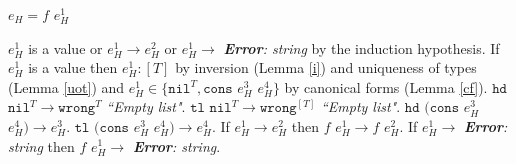 \begin{case}

$e_{H}=f$ $e_{H}^{1}$

$e_{H}^{1}$ is a value or $e_{H}^{1}\rightarrow e_{H}^{2}$ or $e_{H}^{1}\rightarrow$ \emph{\textbf{Error}: string} by the induction hypothesis.  If $e_{H}^{1}$ is a value then $e_{H}^{1}:[T]$ by inversion (Lemma \ref{i}) and uniqueness of types (Lemma \ref{uot}) and $e_{H}^{1}\in\lbrace\mathtt{nil}^{T},\mathtt{cons}$ $e_{H}^{3}$ $e_{H}^{4}\rbrace$ by canonical forms (Lemma \ref{cf}).  $\mathtt{hd}$ $\mathtt{nil}^{T}\rightarrow\mathtt{wrong}^{T}$ \emph{``Empty list"}.  $\mathtt{tl}$ $\mathtt{nil}^{T}\rightarrow\mathtt{wrong}^{[T]}$ \emph{``Empty list"}.  $\mathtt{hd}$ $(\mathtt{cons}$ $e_{H}^{3}$ $e_{H}^{4})\rightarrow e_{H}^{3}$.  $\mathtt{tl}$ $(\mathtt{cons}$ $e_{H}^{3}$ $e_{H}^{4})\rightarrow e_{H}^{4}$.  If $e_{H}^{1}\rightarrow e_{H}^{2}$ then $f$ $e_{H}^{1}\rightarrow f$ $e_{H}^{2}$.  If $e_{H}^{1}\rightarrow$ \emph{\textbf{Error}: string} then $f$ $e_{H}^{1}\rightarrow$ \emph{\textbf{Error}: string}.

\end{case}